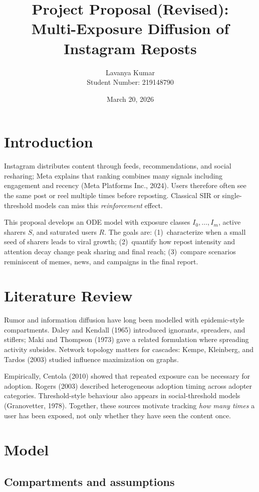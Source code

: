 \documentclass[11pt]{article}
\title{Project Proposal (Revised):\\Multi-Exposure Diffusion of Instagram Reposts}
\author{Lavanya Kumar\\Student Number: 219148790}
\date{March 20, 2026}
\begin{document}
\maketitle

\section{Introduction}

Instagram distributes content through feeds, recommendations, and social resharing; Meta explains that ranking combines many signals including engagement and recency (Meta Platforms Inc., 2024). Users therefore often see the same post or reel multiple times before reposting. Classical SIR or single-threshold models can miss this \emph{reinforcement} effect.

This proposal develops an ODE model with exposure classes $I_0,\ldots,I_m$, active sharers $S$, and saturated users $R$. The goals are: (1)~characterize when a small seed of sharers leads to viral growth; (2)~quantify how repost intensity and attention decay change peak sharing and final reach; (3)~compare scenarios reminiscent of memes, news, and campaigns in the final report.

\section{Literature Review}

Rumor and information diffusion have long been modelled with epidemic-style compartments. Daley and Kendall (1965) introduced ignorants, spreaders, and stiflers; Maki and Thompson (1973) gave a related formulation where spreading activity subsides. Network topology matters for cascades: Kempe, Kleinberg, and Tardos (2003) studied influence maximization on graphs.

Empirically, Centola (2010) showed that repeated exposure can be necessary for adoption. Rogers (2003) described heterogeneous adoption timing across adopter categories. Threshold-style behaviour also appears in social-threshold models (Granovetter, 1978). Together, these sources motivate tracking \emph{how many times} a user has been exposed, not only whether they have seen the content once.

\section{Model}

\subsection{Compartments and assumptions}
\end{document}

